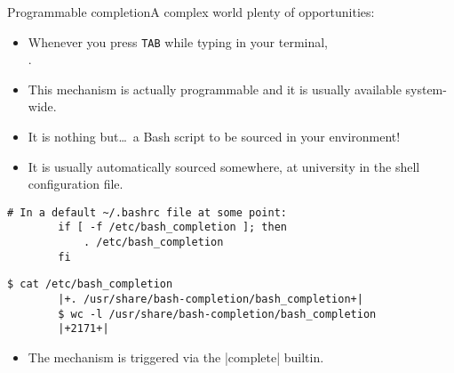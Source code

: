 
\begin{frame}[fragile]{Programmable completion}{A complex world plenty of opportunities: \enspace{}}
    \vspace{-3mm}
    \begin{itemize}
        \item Whenever you press \texttt{TAB} while typing in your terminal,\\ .
        \item This mechanism is actually programmable and it is usually available system-wide.
        \item It is nothing but\ldots\ a Bash script to be sourced in your environment!
        \item It is usually automatically sourced somewhere, at university in the shell configuration file.
    \end{itemize}
    \begin{lstlisting}[style=myBash, numbers=none, aboveskip=2mm]
        # In a default ~/.bashrc file at some point:
        if [ -f /etc/bash_completion ]; then
            . /etc/bash_completion
        fi
    \end{lstlisting}
    \begin{lstlisting}[style=myBash, numbers=none, aboveskip=2mm, belowskip=-5mm]
        $ cat /etc/bash_completion
        |+. /usr/share/bash-completion/bash_completion+|
        $ wc -l /usr/share/bash-completion/bash_completion
        |+2171+|
    \end{lstlisting}
    \begin{itemize}
        \item The mechanism is triggered via the \bash|complete| builtin.
    \end{itemize}
\end{frame}
